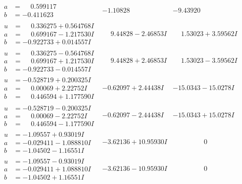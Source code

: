 \documentclass[1p]{elsarticle_modified}
\theoremstyle{definition}
\begin{document}
$$\begin{array}{c|c|c}
\begin{aligned}
a &= \phantom{-}0.599117\phantom{ +0.000000I} \\
b &= -0.411623\phantom{ +0.000000I}\end{aligned}
 & -1.10828\phantom{ +0.000000I} & -9.43920\phantom{ +0.000000I} \\ \hline\begin{aligned}
u &= \phantom{-}0.336275 + 0.564768 I \\
a &= \phantom{-}0.699167 - 1.217530 I \\
b &= -0.922733 + 0.014557 I\end{aligned}
 & \phantom{-}9.44828 - 2.46853 I & \phantom{-}1.53023 + 3.59562 I \\ \hline\begin{aligned}
u &= \phantom{-}0.336275 - 0.564768 I \\
a &= \phantom{-}0.699167 + 1.217530 I \\
b &= -0.922733 - 0.014557 I\end{aligned}
 & \phantom{-}9.44828 + 2.46853 I & \phantom{-}1.53023 - 3.59562 I \\ \hline\begin{aligned}
u &= -0.528719 + 0.200325 I \\
a &= \phantom{-}0.00069 + 2.22752 I \\
b &= \phantom{-}0.446594 + 1.177590 I\end{aligned}
 & -0.62097 + 2.44438 I & -15.0343 - 15.0278 I \\ \hline\begin{aligned}
u &= -0.528719 - 0.200325 I \\
a &= \phantom{-}0.00069 - 2.22752 I \\
b &= \phantom{-}0.446594 - 1.177590 I\end{aligned}
 & -0.62097 - 2.44438 I & -15.0343 + 15.0278 I \\ \hline\begin{aligned}
u &= -1.09557 + 0.93019 I \\
a &= -0.029411 - 1.088810 I \\
b &= -1.04502 - 1.16551 I\end{aligned}
 & -3.62136 + 10.95930 I & \phantom{-0.000000 } 0 \\ \hline\begin{aligned}
u &= -1.09557 - 0.93019 I \\
a &= -0.029411 + 1.088810 I \\
b &= -1.04502 + 1.16551 I\end{aligned}
 & -3.62136 - 10.95930 I & \phantom{-0.000000 } 0 \\ \hline\begin{aligned}

\end{aligned}
\end{array}$$
\end{document}
